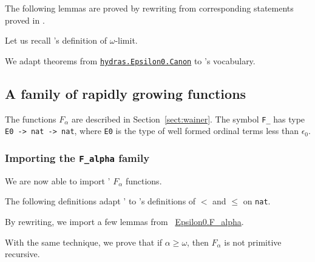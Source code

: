 
The following lemmas are proved by rewriting from corresponding statements proved in \HydrasLib.



Let us recall \gaia's definition of $\omega$-limit.


We adapt theorems from \href{../theories/html/hydras.Epsilon0.Canon.html}%
{\texttt{hydras.Epsilon0.Canon}} to \gaia's vocabulary.


\subsection{A family of rapidly growing functions}

The functions $F_\alpha$ are described in Section~\vref{sect:wainer}. The symbol \texttt{F\_} has type \texttt{E0 -> nat -> nat},
where \texttt{E0} is the type of well formed ordinal terms less than $\epsilon_0$.

\subsubsection{Importing the \texttt{F\_alpha} family}

We are now able to import \HydrasLib' $F_\alpha$ functions.






The following definitions adapt \HydrasLib' to \ssreflect's 
definitions of $<$ and $\leq$ on \texttt{nat}.


By rewriting, we import a few lemmas from
~\href{../theories/html/hydras.Epsilon0.F_alpha.html}{Epsilon0.F\_alpha}.




With the same technique, we prove that if
$\alpha\geq\omega$, then $F_\alpha$ is not primitive recursive.







